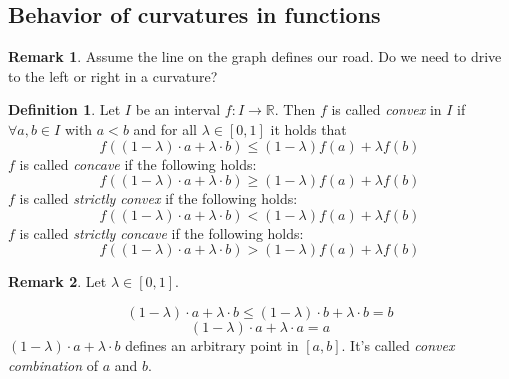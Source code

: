 \documentclass[a4paper,landscape,twocolumn]{article}
\theoremstyle{definition}
\newtheorem{defi}{Definition}
\newtheorem{rem}{Remark}
\begin{document}
\subsection{Behavior of curvatures in functions}
%
\begin{rem}
  Assume the line on the graph defines our road.
  Do we need to drive to the left or right in a curvature?
\end{rem}
%
\begin{defi}
  Let $I$ be an interval $f: I \to \mathbb R$. Then $f$ is called \emph{convex}
  in $I$ if $\forall a,b \in I$ with $a < b$ and for all $\lambda \in [0,1]$
  it holds that
  \[ f((1 - \lambda) \cdot a + \lambda \cdot b) \leq (1 - \lambda) f(a) + \lambda f(b) \]
  $f$ is called \emph{concave} if the following holds:
  \[ f((1 - \lambda) \cdot a + \lambda \cdot b) \geq (1 - \lambda) f(a) + \lambda f(b) \]
  $f$ is called \emph{strictly convex} if the following holds:
  \[ f((1 - \lambda) \cdot a + \lambda \cdot b) < (1 - \lambda) f(a) + \lambda f(b) \]
  $f$ is called \emph{strictly concave} if the following holds:
  \[ f((1 - \lambda) \cdot a + \lambda \cdot b) > (1 - \lambda) f(a) + \lambda f(b) \]
\end{defi}
%
\begin{rem}
  Let $\lambda \in [0,1]$.

  \[ (1 - \lambda) \cdot a + \lambda \cdot b \leq (1 - \lambda) \cdot b + \lambda \cdot b = b \]
  \[ (1 - \lambda) \cdot a + \lambda \cdot a = a \]
  $(1 - \lambda) \cdot a + \lambda \cdot b$ defines an arbitrary point in $[a,b]$.
  It's called \emph{convex combination} of $a$ and $b$.
\end{rem}
%
\end{document}
